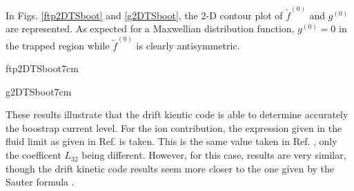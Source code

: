 In Figs. \ref{ftp2DTSboot} and \ref{g2DTSboot}, the 2-D contour plot of $%
\widetilde{f}^{(0)}$ and $g^{\left( 0\right) }$ are represented. As expected
for a Maxwellian distribution function, $g^{\left( 0\right) }=0$ in the
trapped region while $\widetilde{f}^{(0)}$ is clearly antisymmetric.

{ftp2DTSboot}{7cm} %

{g2DTSboot}{7cm} %

These results illustrate that the drift kientic code is able to determine
accurately the boostrap current level. For the ion contribution, the
expression given in the fluid limit as given in Ref. \cite{hir88} is taken.
This is the same value taken in Ref. \cite{sau99}, only the coefficent $%
L_{32}$ being different. However, for this case, results are very similar,
though the drift kinetic code results seem more closer to the one given by
the Sauter formula \cite{sau99}\cite{sau02}.
